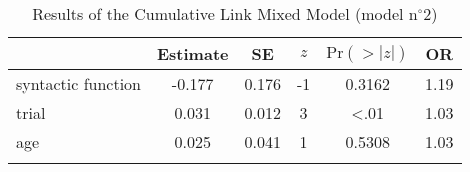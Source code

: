 \begin{table}
\begin{tabular}{l S[table-format=-1.3] S[table-format=1.3] S[table-format=-1.0] S[table-format=<1.4] S[table-format=1.2]}
  \lsptoprule
 & {Estimate} & {SE} & {$z$} & {$\text{Pr}(>|z|)$} & {OR} \\ 
  \midrule
  syntactic function & -0.177 & 0.176 & -1 & 0.3162 & 1.19 \\ 
  trial              & 0.031 & 0.012 & 3 & <.01 & 1.03 \\ 
  age                & 0.025 & 0.041 & 1 & 0.5308 & 1.03 \\ 
   \lspbottomrule
\end{tabular}
\caption{Results of the Cumulative Link Mixed Model (model n$^{\circ}$2)}
\label{tab:exp11-m2}
\end{table}
